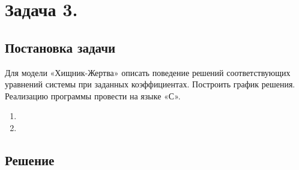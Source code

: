 

\section{Задача 3.}
\subsection{Постановка задачи}
Для модели «Хищник-Жертва» описать поведение решений соответствующих
уравнений системы при заданных коэффициентах. Построить график решения.\\
Реализацию программы провести на языке «С».

\begin{enumerate}[label={}]
	\item \system
	\item \conditions
\end{enumerate}


\newpage

\subsection{Решение}
\solutionItemThird
